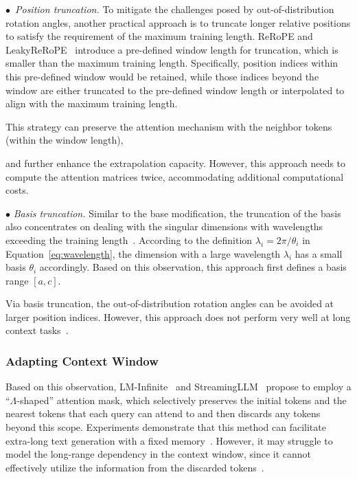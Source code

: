 $\bullet$~\emph{Position truncation.} To mitigate the challenges posed by out-of-distribution rotation angles, another practical approach is to truncate longer relative positions to satisfy the requirement of the maximum training length. ReRoPE and LeakyReRoPE~\cite{su-online-2023-Rerope} introduce a pre-defined window length for truncation, which is smaller than the maximum training length. Specifically, position indices within this pre-defined window would be retained, while those indices beyond the window are either truncated to the pre-defined window length or interpolated to align with the maximum training length. {This strategy can preserve the attention mechanism with the neighbor tokens (within the window length), 

} and further enhance the extrapolation capacity. {However, this approach needs to compute the attention matrices twice, accommodating additional computational costs.}

$\bullet$ \emph{Basis truncation.} Similar to the base modification, the truncation of the basis also concentrates on dealing with the singular dimensions with wavelengths exceeding the training length~\cite{Pal-arxiv-2023-giraffe}. According to the definition $\lambda_i=2\pi/\theta_i$ in Equation~\ref{eq:wavelength}, the dimension with a large wavelength $\lambda_i$ has a small basis $\theta_i$ accordingly. Based on this observation, this approach first defines a basis range $[a, c]$. 

{Via basis truncation, the out-of-distribution rotation angles can be avoided at larger position indices. However, this approach does not perform very well at long context tasks~\cite{Pal-arxiv-2023-giraffe}.}

\subsubsection{Adapting Context Window}

Based on this observation, LM-Infinite~\cite{Han-arxiv-2023-LMinfinite} and StreamingLLM~\cite{Xiao-arxiv-2023-Efficient} propose to employ a ``$\Lambda$-shaped'' attention mask, which selectively preserves the initial tokens and the nearest tokens that each query can attend to and then discards any tokens beyond this scope. {Experiments demonstrate that this method can facilitate extra-long text generation with a fixed memory~\cite{Xiao-arxiv-2023-Efficient}.}  However, it may struggle to model the long-range dependency in the context window, {since it cannot effectively utilize the information from the discarded tokens~\cite{Xiao-arxiv-2023-Efficient}.}

